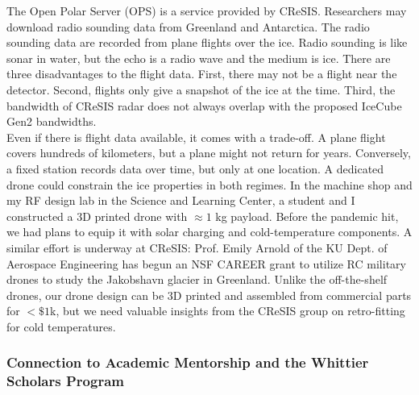 \documentclass[../../../main.tex]{subfiles}
\begin{document}
The Open Polar Server (OPS) is a service provided by CReSIS.  Researchers may download radio sounding data from Greenland and Antarctica.  The radio sounding data are recorded from plane flights over the ice.  Radio sounding is like sonar in water, but the echo is a radio wave and the medium is ice.  There are three disadvantages to the flight data.  First, there may not be a flight near the detector.  Second, flights only give a snapshot of the ice at the time.  Third, the bandwidth of CReSIS radar does not always overlap with the proposed IceCube Gen2 bandwidths.
\\
\vspace{0.15cm}
Even if there is flight data available, it comes with a trade-off.  A plane flight covers hundreds of kilometers, but a plane might not return for years.  Conversely, a fixed station records data over time, but only at one location.  A dedicated drone could constrain the ice properties in both regimes.  In the machine shop and my RF design lab in the Science and Learning Center, a student and I constructed a 3D printed drone with $\approx 1$ kg payload.  Before the pandemic hit, we had plans to equip it with solar charging and cold-temperature components.  A similar effort is underway at CReSIS: Prof. Emily Arnold of the KU Dept. of Aerospace Engineering has begun an NSF CAREER grant to utilize RC military drones to study the Jakobshavn glacier in Greenland.  Unlike the off-the-shelf drones, our drone design can be 3D printed and assembled from commercial parts for $< \$1$k, but we need valuable insights from the CReSIS group on retro-fitting for cold temperatures.

\subsubsection{Connection to Academic Mentorship and the Whittier Scholars Program}
\end{document}
